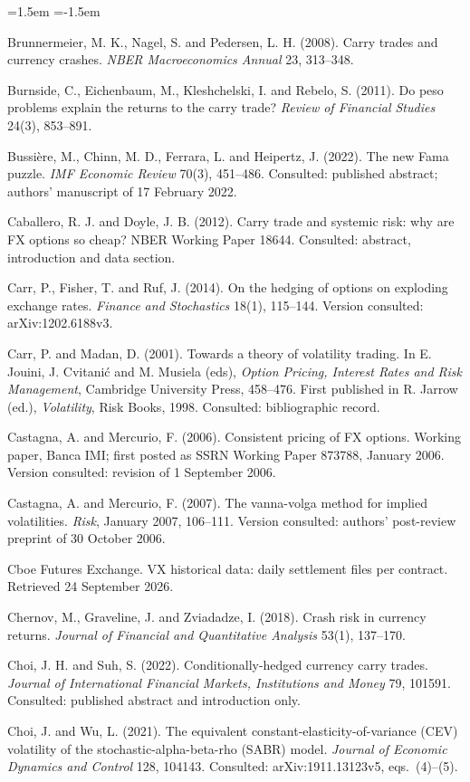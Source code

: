 \documentclass[11pt]{article}
\theoremstyle{result}
\begin{document}
\begin{list}{}{\leftmargin=1.5em \itemindent=-1.5em \itemsep=2pt \parsep=0pt}
\item Brunnermeier, M. K., Nagel, S. and Pedersen, L. H. (2008). Carry trades and currency crashes. \emph{NBER Macroeconomics Annual} 23, 313--348.
\item Burnside, C., Eichenbaum, M., Kleshchelski, I. and Rebelo, S. (2011). Do peso problems explain the returns to the carry trade? \emph{Review of Financial Studies} 24(3), 853--891.
\item Bussi\`ere, M., Chinn, M. D., Ferrara, L. and Heipertz, J. (2022). The new Fama puzzle. \emph{IMF Economic Review} 70(3), 451--486. Consulted: published abstract; authors' manuscript of 17 February 2022.
\item Caballero, R. J. and Doyle, J. B. (2012). Carry trade and systemic risk: why are FX options so cheap? NBER Working Paper 18644. Consulted: abstract, introduction and data section.
\item Carr, P., Fisher, T. and Ruf, J. (2014). On the hedging of options on exploding exchange rates. \emph{Finance and Stochastics} 18(1), 115--144. Version consulted: arXiv:1202.6188v3.
\item Carr, P. and Madan, D. (2001). Towards a theory of volatility trading. In E. Jouini, J. Cvitani\'c and M. Musiela (eds), \emph{Option Pricing, Interest Rates and Risk Management}, Cambridge University Press, 458--476. First published in R. Jarrow (ed.), \emph{Volatility}, Risk Books, 1998. Consulted: bibliographic record.
\item Castagna, A. and Mercurio, F. (2006). Consistent pricing of FX options. Working paper, Banca IMI; first posted as SSRN Working Paper 873788, January 2006. Version consulted: revision of 1 September 2006.
\item Castagna, A. and Mercurio, F. (2007). The vanna-volga method for implied volatilities. \emph{Risk}, January 2007, 106--111. Version consulted: authors' post-review preprint of 30 October 2006.
\item Cboe Futures Exchange. VX historical data: daily settlement files per contract. Retrieved 24 September 2026.
\item Chernov, M., Graveline, J. and Zviadadze, I. (2018). Crash risk in currency returns. \emph{Journal of Financial and Quantitative Analysis} 53(1), 137--170.
\item Choi, J. H. and Suh, S. (2022). Conditionally-hedged currency carry trades. \emph{Journal of International Financial Markets, Institutions and Money} 79, 101591. Consulted: published abstract and introduction only.
\item Choi, J. and Wu, L. (2021). The equivalent constant-elasticity-of-variance (CEV) volatility of the stochastic-alpha-beta-rho (SABR) model. \emph{Journal of Economic Dynamics and Control} 128, 104143. Consulted: arXiv:1911.13123v5, eqs.~(4)--(5).

\end{list}
\end{document}
